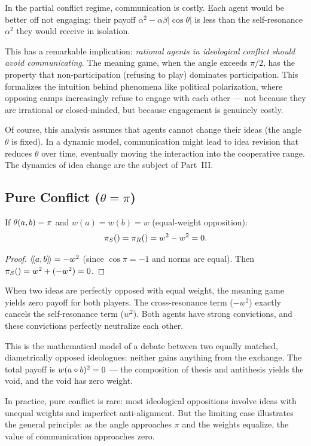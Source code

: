\begin{interpretation}
\label{interp:conflict-cost}
In the partial conflict regime, communication is costly. Each agent would be
better off not engaging: their payoff $\alpha^2 - \alpha\beta|\cos\theta|$ is
less than the self-resonance $\alpha^2$ they would receive in isolation.

This has a remarkable implication: \emph{rational agents in ideological conflict
should avoid communicating}. The meaning game, when the angle exceeds $\pi/2$,
has the property that non-participation (refusing to play) dominates
participation. This formalizes the intuition behind phenomena like political
polarization, where opposing camps increasingly refuse to engage with each
other --- not because they are irrational or closed-minded, but because
engagement is genuinely costly.

Of course, this analysis assumes that agents cannot change their ideas (the angle
$\theta$ is fixed). In a dynamic model, communication might lead to idea
revision that reduces $\theta$ over time, eventually moving the interaction into
the cooperative range. The dynamics of idea change are the subject of Part~III.
\end{interpretation}


\subsection{Pure Conflict ($\theta = \pi$)}

\begin{proposition}
\label{prop:pure-conflict}
If $\theta(a,b) = \pi$ and $w(a) = w(b) = w$ (equal-weight opposition):
\[
  \pi_{S}() = \pi_{R}() = w^2 - w^2 = 0.
\]
\end{proposition}

\begin{proof}
$\langle\!\langle a, b \rangle\!\rangle = -w^2$ (since $\cos\pi = -1$ and norms are equal). Then
$\pi_{S}() = w^2 + (-w^2) = 0$.
\end{proof}

\begin{interpretation}
\label{interp:zero-sum}
When two ideas are perfectly opposed with equal weight, the meaning game
yields zero payoff for both players. The cross-resonance term ($-w^2$) exactly
cancels the self-resonance term ($w^2$). Both agents have strong convictions,
and these convictions perfectly neutralize each other.

This is the mathematical model of a debate between two equally matched,
diametrically opposed ideologues: neither gains anything from the exchange.
The total payoff is $w(a \circ b)^2 = 0$ --- the composition of thesis and
antithesis yields the void, and the void has zero weight.

In practice, pure conflict is rare: most ideological oppositions involve ideas
with unequal weights and imperfect anti-alignment. But the limiting case
illustrates the general principle: as the angle approaches $\pi$ and the
weights equalize, the value of communication approaches zero.
\end{interpretation}



